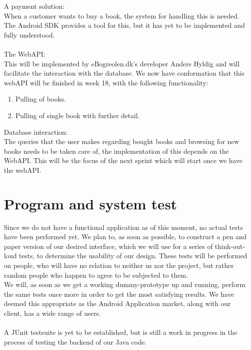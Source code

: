 \message{ !name(Rapport.tex)}\documentclass[12pt]{article}
\begin{document}
A payment solution:\\
When a customer wants to buy a book, the system for handling this is needed. The Android SDK provides a tool for this, but it has yet to be implemented and fully understood.
\\\\
The WebAPI:\\
This will be implemented by eBogreolen.dk's developer Anders Hyldig and will facilitate the interaction with the database. We now have conformation that this webAPI will be finished in week 18, with the following functionality:
\begin{enumerate}
\item Pulling of books.
\item Pulling of single book with further detail.
\end{enumerate}
Database interaction:\\
The queries that the user makes regarding bought books and browsing for new books needs to be taken care of, the implementation of this depends on the WebAPI. This will be the focus of the next sprint which will start once we have the webAPI.
\section{Program and system test}
\label{systest}
Since we do not have a functional application as of this moment, no actual tests have been performed yet. We plan to, as soon as possible, to construct a pen and paper version of our desired interface, which we will use for a series of think-out-loud tests, to determine the usability of our design. These tests will be performed on people, who will have no relation to neither us nor the project, but rather random people who happen to agree to be subjected to them.\\
We will, as soon as we get a working dummy-prototype up  and running, perform the same tests once more in order to get the most satisfying results. We have deemed this appropriate as the Android Application market, along with our client, has a wide range of users.\\ \\
A JUnit testsuite is yet to be established, but is still a work in progress in the process of testing the backend of our Java code.
\end{document}
